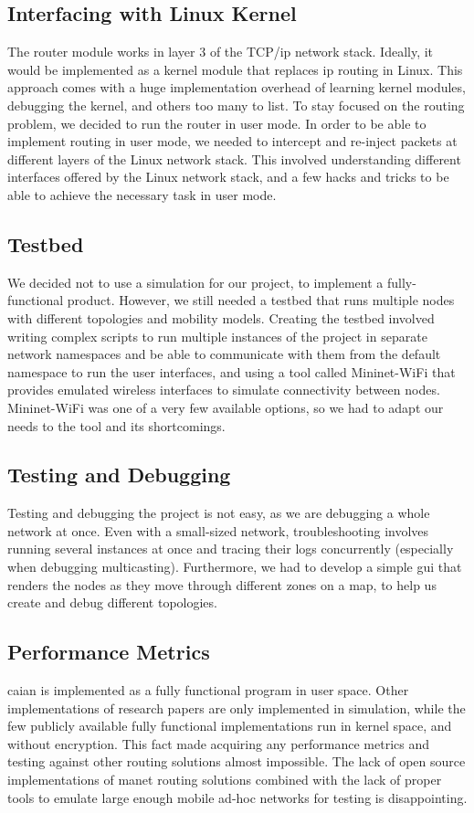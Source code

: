 \subsection{Interfacing with Linux Kernel}
The router module works in layer 3 of the TCP/\acrshort{ip} network stack. Ideally, it would be implemented as a kernel module that replaces \acrshort{ip} routing in Linux. This approach comes with a huge implementation overhead of learning kernel modules, debugging the kernel, and others too many to list. To stay focused on the routing problem, we decided to run the router in user mode. In order to be able to implement routing in user mode, we needed to intercept and re-inject packets at different layers of the Linux network stack. This involved understanding different interfaces offered by the Linux network stack, and a few hacks and tricks to be able to achieve the necessary task in user mode.

\subsection{Testbed}
We decided not to use a simulation for our project, to implement a fully-functional product. However, we still needed a testbed that runs multiple nodes with different topologies and mobility models. Creating the testbed involved writing complex scripts to run multiple instances of the project in separate network namespaces and be able to communicate with them from the default namespace to run the user interfaces, and using a tool called Mininet-WiFi that provides emulated wireless interfaces to simulate connectivity between nodes. Mininet-WiFi was one of a very few available options, so we had to adapt our needs to the tool and its shortcomings.

\subsection{Testing and Debugging}
Testing and debugging the project is not easy, as we are debugging a whole network at once. Even with a small-sized network, troubleshooting involves running several instances at once and tracing their logs concurrently (especially when debugging multicasting). Furthermore, we had to develop a simple \acrshort{gui} that renders the nodes as they move through different zones on a map, to help us create and debug different topologies.

\subsection{Performance Metrics}
\acrshort{caian} is implemented as a fully functional program in user space. Other implementations of research papers are only implemented in simulation, while the few publicly available fully functional implementations run in kernel space, and without encryption. This fact made acquiring any performance metrics and testing against other routing solutions almost impossible. The lack of open source implementations of \acrshort{manet} routing solutions combined with the lack of proper tools to emulate large enough mobile ad-hoc networks for testing is disappointing. 

